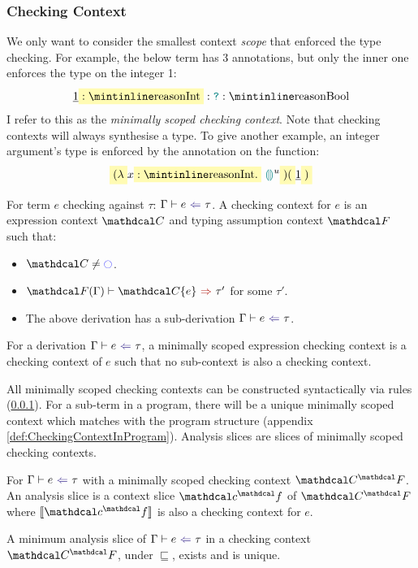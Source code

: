 \subsubsection{Checking Context}
\label{sec:CheckingContexts}
We only want to consider the smallest context \textit{scope} that enforced the type checking. For example, the below term has 3 annotations, but only the inner one enforces the  type on the integer 1:
\[\underline{1} \hlcmaths[yellow!30]{: \code{Int}} : \dyn : \code{Bool}\]
I refer to this as the \textit{minimally scoped checking context}. Note that checking contexts will always synthesise a type. To give another example, an integer argument's type is enforced by the annotation on the function:
\[\hlcmaths[yellow!30]{(\lambda} x \hlcmaths[yellow!30]{: \code{Int}.}\ \hole^u\hlcmaths[yellow!30]{)(}\underline{1}\hlcmaths[yellow!30]{)}\]


\begin{definition}
\label{def:CheckingContext}
For term $e$ checking against $\tau$: $\analysis[\Gamma]{e}{\tau}$. A checking context for $e$ is an expression context $\C$ and typing assumption context $\F$ such that: 
\begin{itemize}
\item $\C \neq \cmark$.
\item $\synthesis[\F(\Gamma)]{\C\{e\}}{\tau'}$ for some $\tau'$.
\item The above derivation has a sub-derivation $\analysis[\Gamma]{e}{\tau}$.
\end{itemize}
\end{definition}
\begin{definition}
For a derivation $\analysis[\Gamma]{e}{\tau}$, a minimally scoped expression checking context is a checking context of $e$ such that no sub-context is also a checking context.
\end{definition}

All minimally scoped checking contexts can be constructed syntactically via rules (\cref{sec:CheckingContexts}). For a sub-term in a program, there will be a unique minimally scoped context which matches with the program structure (appendix \cref{def:CheckingContextInProgram}). Analysis slices are slices of minimally scoped checking contexts.
\begin{definition}\label{def:analysisslice}
For $\analysis{e}{\tau}$ with a minimally scoped checking context $\C^\F$. An analysis slice is a context slice $\Cs^\f$ of $\C^\F$ where $\type{\Cs^\f}$ is also a checking context for $e$.
\end{definition}
\begin{conjecture}\label{conj:AnalysisSliceUniqueness}
A minimum analysis slice of $\analysis{e}{\tau}$ in a checking context $\C^\F$, under $\sqsubseteq$, exists and is unique.
\end{conjecture}

